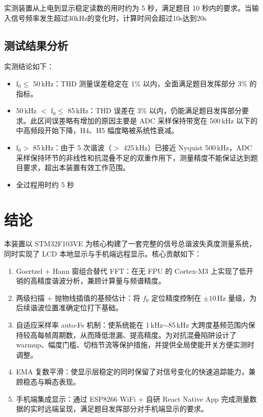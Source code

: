\documentclass[a4paper]{article}
\begin{document}
	实测装置从上电到显示稳定读数的用时约为 5 秒，满足题目 10 秒内的要求。当输入信号频率发生超过30kHz的变化时，计算时间会超过10s达到20s

	\subsection{测试结果分析}

	实测结论如下：
	\begin{itemize}[leftmargin=2em]
		\item f$_0 \leq$ 50\,kHz：THD 测量误差稳定在 1\% 以内，全面满足题目发挥部分 3\% 的指标。
		\item 50\,kHz $<$ f$_0 \leq$ 85\,kHz：THD 误差在 3\% 以内，仍能满足题目发挥部分要求。此区间误差略有增加的原因主要是 ADC 采样保持带宽在 500\,kHz 以下的中高频段开始下降，H4、H5 幅度略被系统性衰减。
		\item f$_0 >$ 85\,kHz：由于 5 次谐波（$>$ 425\,kHz）已接近 Nyquist 500\,kHz，ADC 采样保持环节的非线性和抗混叠不足的双重作用下，测量精度不能保证达到题目要求，超出本装置有效工作范围。
		\item 全过程用时约 5 秒
	\end{itemize}

	\newpage
	\section{结论}

	本装置以 STM32F103VE 为核心构建了一套完整的信号总谐波失真度测量系统，同时实现了 LCD 本地显示与手机端远程显示。核心贡献如下：

	\begin{enumerate}[leftmargin=2em]
		\item Goertzel + Hann 窗组合替代 FFT：在无 FPU 的 Cortex-M3 上实现了低开销的高精度谐波分析，兼顾计算量与频谱精度。
		\item 两级扫描 + 抛物线插值的基频估计：将 $f_0$ 定位精度控制在 $\pm 10$\,Hz 量级，为后续谐波位置准确定位打下基础。
		\item 自适应采样率 auto-Fs 机制：使系统能在 1\,kHz$\sim$85\,kHz 大跨度基频范围内保持较高每帧周期数，从而降低泄漏、提高精度。为对抗混叠陷阱设计了 warmup、幅度门槛、切档节流等保护措施，并提供全局使能开关方便实测时调整。
		\item EMA 复数平滑：使显示层稳定的同时保留了对信号变化的快速追踪能力，兼顾稳态与瞬态表现。
		\item 手机端集成显示：通过 ESP8266 WiFi + 自研 React Native App 完成测量数据的实时远端呈现，满足题目发挥部分对手机端显示的要求。
	\end{enumerate}
\end{document}
